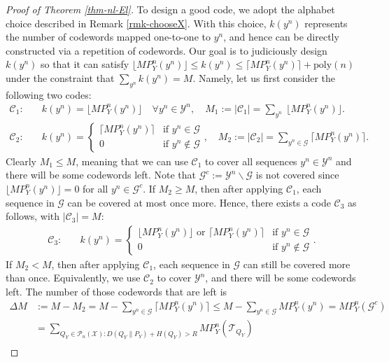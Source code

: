 \documentclass[10pt,a4paper]{amsart}
\newcommand{\mC}{\mathcal{C}}
\newcommand{\mG}{\mathcal{G}}
\newcommand{\mP}{\mathcal{P}}
\newcommand{\mT}{\mathcal{T}}
\newcommand{\mX}{\mathcal{X}}
\newcommand{\mY}{\mathcal{Y}}
\begin{document}
\begin{proof}[Proof of Theorem \ref{thm-nl-El}]
To design a good code, we adopt the alphabet choice described in Remark \ref{rmk-chooseX}. With this choice, $k(y^n)$ represents the number of codewords mapped one-to-one to $y^n$, and hence can be directly constructed via a repetition of codewords. Our goal is to judiciously design $k(y^n)$  so that it can satisfy $\lfloor MP_Y^n(y^n) \rfloor \leq k(y^n) \leq \lceil MP_Y^n(y^n) \rceil + \mathrm{poly}(n)$ under the constraint that $\sum_{y^n} k(y^n) = M$. Namely, let us first consider the following two codes:
\begin{align*}
    \mC_1: \quad 
    & k(y^n) = \lfloor MP_Y^n(y^n) \rfloor \quad \forall y^n\in\mY^n, \quad
    M_1 := |\mC_1| = \sum_{y^n} \ \lfloor MP_Y^n(y^n) \rfloor. \\
    \mC_2: \quad 
    & k(y^n) = 
    \begin{cases}
        \lceil MP_Y^n(y^n) \rceil & \text{if } y^n\in\mG \\
        0 & \text{if } y^n\notin\mG
    \end{cases}, \quad
    M_2 := |\mC_2| = \sum_{y^n\in\mG} \lceil MP_Y^n(y^n) \rceil.
\end{align*}
Clearly $M_1\leq M$, meaning that we can use $\mC_1$ to cover all sequences $y^n\in\mY^n$ and there will be some codewords left. Note that $\mG^c := \mY^n\backslash\mG$ is not covered since $\lfloor MP_Y^n(y^n) \rfloor = 0$ for all $y^n\in\mG^c$.
If $M_2\geq M$, then after applying $\mC_1$, each sequence in $\mG$ can be covered at most once more. Hence, there exists a code $\mC_3$ as follows, with $|\mC_3| = M$:
\begin{align*}
    \mC_3: \quad 
    & k(y^n) = 
    \begin{cases}
        \lfloor MP_Y^n(y^n) \rfloor \text{ or } \lceil MP_Y^n(y^n) \rceil  & \text{if } y^n\in\mG \\
        0 & \text{if } y^n\notin\mG
    \end{cases}.
\end{align*}
If $M_2<M$, then after applying $\mC_1$, each sequence in $\mG$ can still be covered more than once. Equivalently, we use $\mC_2$ to cover $\mY^n$, and there will be some codewords left. The number of those codewords that are left is
\begin{align*}
    \Delta M &:= M - M_2 
    = M - \sum_{y^n\in\mG} \lceil MP_Y^n(y^n) \rceil 
    \leq M - \sum_{y^n\in\mG} MP_Y^n(y^n) 
    = M P_Y^n(\mG^c) \\
    &= \sum_{Q_Y\in\mP_n(\mX): D(Q_Y\|P_Y) + H(Q_Y)>R} MP_Y^n(\mT_{Q_Y}) \\

\end{align*}
\end{proof}
\end{document}
